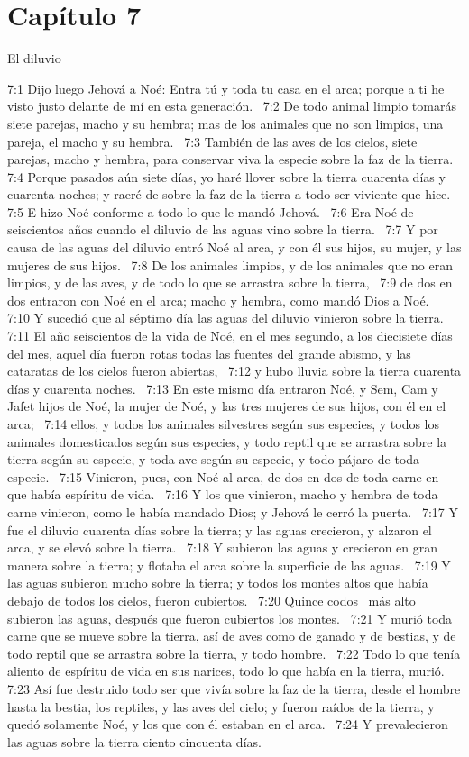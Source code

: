 \section*{Capítulo 7}
El diluvio  

7:1 Dijo luego Jehová a Noé: Entra tú y toda tu casa en el arca; porque a ti he visto justo delante de mí en esta generación.  
7:2 De todo animal limpio tomarás siete parejas, macho y su hembra; mas de los animales que no son limpios, una pareja, el macho y su hembra.  
7:3 También de las aves de los cielos, siete parejas, macho y hembra, para conservar viva la especie sobre la faz de la tierra.  
7:4 Porque pasados aún siete días, yo haré llover sobre la tierra cuarenta días y cuarenta noches; y raeré de sobre la faz de la tierra a todo ser viviente que hice.  
7:5 E hizo Noé conforme a todo lo que le mandó Jehová.  
7:6 Era Noé de seiscientos años cuando el diluvio de las aguas vino sobre la tierra.  
7:7 Y por causa de las aguas del diluvio entró Noé al arca, y con él sus hijos, su mujer, y las mujeres de sus hijos.  
7:8 De los animales limpios, y de los animales que no eran limpios, y de las aves, y de todo lo que se arrastra sobre la tierra,  
7:9 de dos en dos entraron con Noé en el arca; macho y hembra, como mandó Dios a Noé.  
7:10 Y sucedió que al séptimo día las aguas del diluvio vinieron sobre la tierra.  
7:11 El año seiscientos de la vida de Noé, en el mes segundo, a los diecisiete días del mes, aquel día fueron rotas todas las fuentes del grande abismo, y las cataratas de los cielos fueron abiertas,  
7:12 y hubo lluvia sobre la tierra cuarenta días y cuarenta noches.  
7:13 En este mismo día entraron Noé, y Sem, Cam y Jafet hijos de Noé, la mujer de Noé, y las tres mujeres de sus hijos, con él en el arca;  
7:14 ellos, y todos los animales silvestres según sus especies, y todos los animales domesticados según sus especies, y todo reptil que se arrastra sobre la tierra según su especie, y toda ave según su especie, y todo pájaro de toda especie.  
7:15 Vinieron, pues, con Noé al arca, de dos en dos de toda carne en que había espíritu de vida.  
7:16 Y los que vinieron, macho y hembra de toda carne vinieron, como le había mandado Dios; y Jehová le cerró la puerta.  
7:17 Y fue el diluvio cuarenta días sobre la tierra; y las aguas crecieron, y alzaron el arca, y se elevó sobre la tierra.  
7:18 Y subieron las aguas y crecieron en gran manera sobre la tierra; y flotaba el arca sobre la superficie de las aguas.  
7:19 Y las aguas subieron mucho sobre la tierra; y todos los montes altos que había debajo de todos los cielos, fueron cubiertos.  
7:20 Quince codos  más alto subieron las aguas, después que fueron cubiertos los montes.  
7:21 Y murió toda carne que se mueve sobre la tierra, así de aves como de ganado y de bestias, y de todo reptil que se arrastra sobre la tierra, y todo hombre.  
7:22 Todo lo que tenía aliento de espíritu de vida en sus narices, todo lo que había en la tierra, murió.  
7:23 Así fue destruido todo ser que vivía sobre la faz de la tierra, desde el hombre hasta la bestia, los reptiles, y las aves del cielo; y fueron raídos de la tierra, y quedó solamente Noé, y los que con él estaban en el arca.  
7:24 Y prevalecieron las aguas sobre la tierra ciento cincuenta días.  
